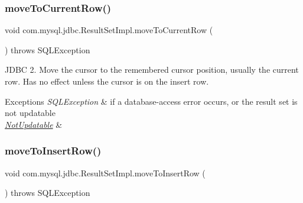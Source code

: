 \mbox{\label{classcom_1_1mysql_1_1jdbc_1_1_result_set_impl_a942943874d58ef0a8a1ba42469448d27}} 
\subsubsection{\texorpdfstring{move\+To\+Current\+Row()}{moveToCurrentRow()}}
{\footnotesize\ttfamily void com.\+mysql.\+jdbc.\+Result\+Set\+Impl.\+move\+To\+Current\+Row (\begin{DoxyParamCaption}{ }\end{DoxyParamCaption}) throws S\+Q\+L\+Exception}

J\+D\+BC 2. Move the cursor to the remembered cursor position, usually the current row. Has no effect unless the cursor is on the insert row.


\begin{DoxyExceptions}{Exceptions}
{\em S\+Q\+L\+Exception} & if a database-\/access error occurs, or the result set is not updatable \\
\hline
{\em \mbox{\hyperlink{classcom_1_1mysql_1_1jdbc_1_1_not_updatable}{Not\+Updatable}}} & \\
\hline
\end{DoxyExceptions}
\mbox{\label{classcom_1_1mysql_1_1jdbc_1_1_result_set_impl_a07626e75359cfe19d8905915f51807ab}} 
\subsubsection{\texorpdfstring{move\+To\+Insert\+Row()}{moveToInsertRow()}}
{\footnotesize\ttfamily void com.\+mysql.\+jdbc.\+Result\+Set\+Impl.\+move\+To\+Insert\+Row (\begin{DoxyParamCaption}{ }\end{DoxyParamCaption}) throws S\+Q\+L\+Exception}

